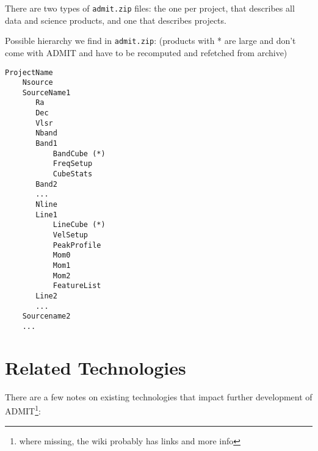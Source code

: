 \documentclass[preprint]{aastex} %
\begin{document}
There are two types of {\tt admit.zip} files: the one per project, that describes
all data and science products, and one that describes projects.

Possible hierarchy we find in {\tt admit.zip}: (products with * are large and don't come
with ADMIT and have to be recomputed and refetched from archive)
\footnotesize
\begin{verbatim}
ProjectName
    Nsource
    SourceName1
       Ra
       Dec
       Vlsr
       Nband
       Band1
           BandCube (*)
           FreqSetup
           CubeStats
       Band2
       ...
       Nline
       Line1
           LineCube (*)
           VelSetup
           PeakProfile
           Mom0
           Mom1
           Mom2
           FeatureList
       Line2
       ...
    Sourcename2
    ...    
\end{verbatim}
\normalsize


\section{Related Technologies}

There are a few notes on existing technologies that 
impact further development of ADMIT\footnote{where missing, the wiki probably has 
links and more info}:
\end{document}
